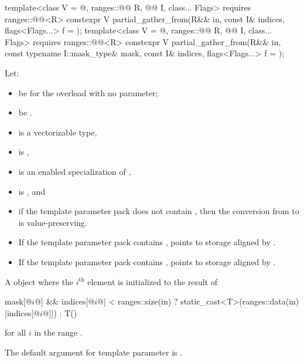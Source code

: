 \begin{itemdecl}
template<class V = @\seebelow@, ranges::@@ R, @@ I, class... Flags>
  requires ranges::@@<R>
  constexpr V partial_gather_from(R&& in, const I& indices, flags<Flags...> f = {});
template<class V = @\seebelow@, ranges::@@ R, @@ I, class... Flags>
  requires ranges::@@<R>
  constexpr V partial_gather_from(R&& in, const typename I::mask_type& mask,
                                  const I& indices, flags<Flags...> f = {});
\end{itemdecl}

\begin{itemdescr}
\pnum
Let:
\begin{itemize}
 \item
   be  for the overload with no
   parameter;
 \item
   be .
\end{itemize}

\pnum
\mandates
\begin{itemize}
\item
{} is a vectorizable type,
\item
{} is ,
\item
{} is an enabled specialization of ,
\item
{} is , and
\item
if the template parameter pack  does not contain
, then the conversion from
 to  is value-preserving.
\end{itemize}

\pnum
\expects
\begin{itemize}
\item
If the template parameter pack  contains
,  points to storage aligned by
.
\item
If the template parameter pack  contains
,  points to
storage aligned by .
\end{itemize}

\pnum
\returns
A  object where the $i^\text{th}$
element is initialized to the result of
\begin{codeblock}
mask[@$i$@] && indices[@$i$@] < ranges::size(in) ? static_cast<T>(ranges::data(in)[indices[@$i$@]]) : T()
\end{codeblock}
for all $i$ in the range .

\pnum
\remarks
The default argument for template parameter  is
.
\end{itemdescr}

